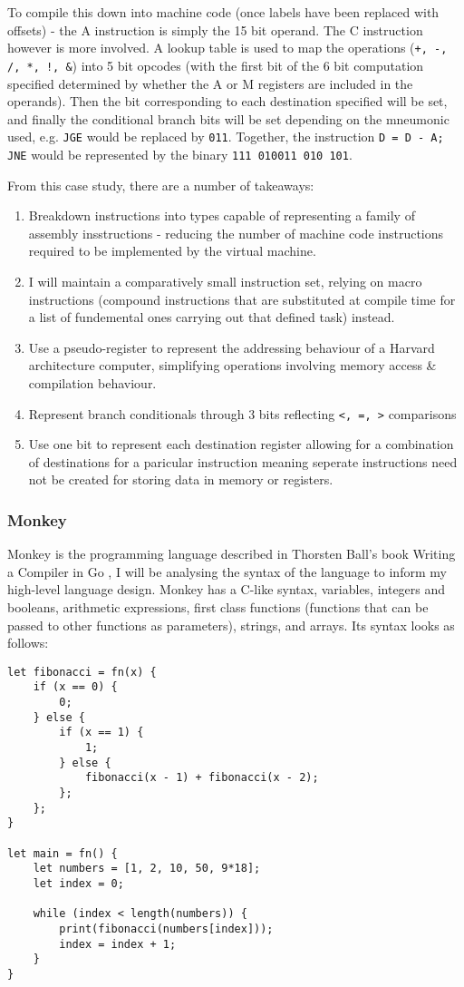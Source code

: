 To compile this down into machine code (once labels have been replaced with offsets) - the A instruction is simply the 15 bit operand. The C instruction however is more involved. A lookup table is used to map the operations (\texttt{+, -, /, *, !, \&}) into 5 bit opcodes (with the first bit of the 6 bit computation specified determined by whether the A or M registers are included in the operands). Then the bit corresponding to each destination specified will be set, and finally the conditional branch bits will be set depending on the mneumonic used, e.g. \texttt{JGE} would be replaced by \texttt{011}. Together, the instruction \texttt{D = D - A; JNE} would be represented by the binary \texttt{111 010011 010 101}. 

From this case study, there are a number of takeaways:
\begin{enumerate}
    \item Breakdown instructions into types capable of representing a family of assembly insstructions - reducing the number of machine code instructions required to be implemented by the virtual machine.
    \item I will maintain a comparatively small instruction set, relying on macro instructions (compound instructions that are substituted at compile time for a list of fundemental ones carrying out that defined task) instead.
    \item Use a pseudo-register to represent the addressing behaviour of a Harvard architecture computer, simplifying operations involving memory access \& compilation behaviour.
    \item Represent branch conditionals through 3 bits reflecting \texttt{<, =, >} comparisons  
    \item Use one bit to represent each destination register allowing for a combination of destinations for a paricular instruction meaning seperate instructions need not be created for storing data in memory or registers.
\end{enumerate}

\subsubsection{Monkey}
Monkey is the programming language described in Thorsten Ball's book Writing a Compiler in Go \textcite{Ball-WritingACompilerInGo}, I will be analysing the syntax of the language to inform my high-level language design. Monkey has a C-like syntax, variables, integers and booleans, arithmetic expressions, first class functions (functions that can be passed to other functions as parameters), strings, and arrays. Its syntax looks as follows:
\begin{lstlisting}
let fibonacci = fn(x) {
    if (x == 0) {
        0;
    } else {
        if (x == 1) {
            1;
        } else {
            fibonacci(x - 1) + fibonacci(x - 2);
        };
    };
}

let main = fn() {
    let numbers = [1, 2, 10, 50, 9*18];
    let index = 0;

    while (index < length(numbers)) {
        print(fibonacci(numbers[index]));
        index = index + 1;
    }
}
\end{lstlisting}

